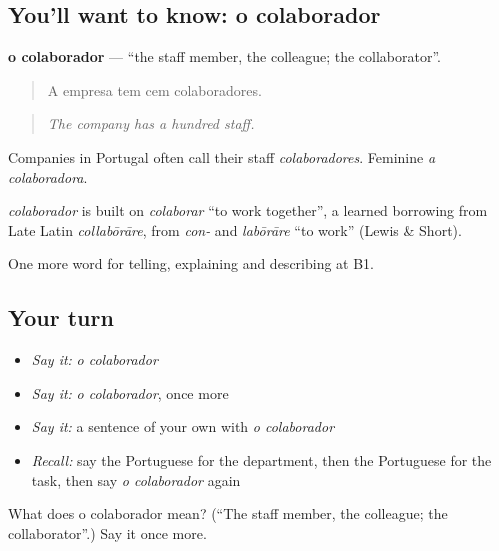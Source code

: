 \subsection*{You'll want to know: o colaborador}
\textbf{o colaborador} — \textquotedblleft{}the staff member, the colleague; the collaborator\textquotedblright{}.

\begin{quote}
A empresa tem cem colaboradores.
\end{quote}

\begin{quote}
\emph{The company has a hundred staff.}
\end{quote}

Companies in Portugal often call their staff \emph{colaboradores}. Feminine \emph{a colaboradora}.

\begin{cousinweb}
\emph{colaborador} is built on \emph{colaborar} \textquotedblleft{}to work together\textquotedblright{}, a learned borrowing from Late Latin \emph{collabōrāre}, from \emph{con-} and \emph{labōrāre} \textquotedblleft{}to work\textquotedblright{} (Lewis \& Short).
\end{cousinweb}

\begin{grammarlens}[title={What you've built}]
One more word for telling, explaining and describing at B1.
\end{grammarlens}

\subsection*{Your turn}
\begin{itemize}
\raggedright
  \item \emph{Say it:} \emph{o colaborador}
  \item \emph{Say it:} \emph{o colaborador}, once more
  \item \emph{Say it:} a sentence of your own with \emph{o colaborador}
  \item \emph{Recall:} say the Portuguese for the department, then the Portuguese for the task, then say \emph{o colaborador} again
\end{itemize}

\begin{tcolorbox}[breakable,colback=teal!4,colframe=teal!35!black,title={Before you move on}]
What does o colaborador mean? (\textquotedblleft{}The staff member, the colleague; the collaborator\textquotedblright{}.) Say it once more.
\end{tcolorbox}
